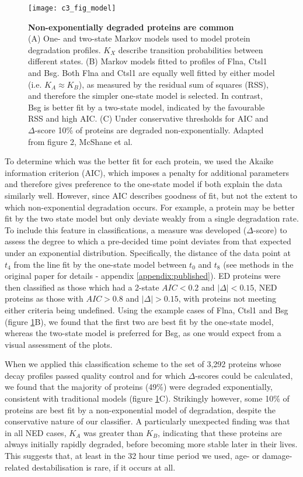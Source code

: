 \documentclass[a4paper,11pt,twoside,openright]{scrbook}
\begin{document}
\begin{figure}[h]
    \texttt{[image: c3\_fig\_model]}
    \caption[Non-exponentially degraded proteins are common]{\sffamily \textbf{Non-exponentially degraded proteins are common} \\ \small (A) One- and two-state Markov models used to model protein degradation profiles. $K_{X}$ describe transition probabilities between different states. (B) Markov models fitted to profiles of Flna, Ctsl1 and Bsg. Both Flna and Ctsl1 are equally well fitted by either model (i.e. $K_{A} \approx K_{B}$), as measured by the residual sum of squares (RSS), and therefore the simpler one-state model is selected. In contrast, Bsg is better fit by a two-state model, indicated by the favourable RSS and high AIC. (C) Under conservative thresholds for AIC and $\Delta$-score 10\% of proteins are degraded non-exponentially. Adapted from figure 2, McShane et al.\cite{McShane2016}}
    \label{figure:model}
\end{figure}

To determine which was the better fit for each protein, we used the Akaike information criterion \cite{Akaike1974} (AIC), which imposes a penalty for additional parameters and therefore gives preference to the one-state model if both explain the data similarly well. However, since AIC describes goodness of fit, but not the extent to which non-exponential degradation occurs. For example, a protein may be better fit by the two state model but only deviate weakly from a single degradation rate. To include this feature in classifications, a measure was developed ($\Delta$-score) to assess the degree to which a pre-decided time point deviates from that expected under an exponential distribution. Specifically, the distance of the data point at $t_{4}$ from the line fit by the one-state model between $t_{0}$ and $t_{8}$ (see methods in the original paper for details - appendix \ref{appendix:published}). ED proteins were then classified as those which had a 2-state $AIC < 0.2$ and $\lvert \Delta \rvert < 0.15$, NED proteins as those with $AIC > 0.8$ and $\lvert \Delta \rvert > 0.15$, with proteins not meeting either criteria being undefined. Using the example cases of Flna, Ctsl1 and Bsg (figure \ref{figure:model}B), we found that the first two are best fit by the one-state model, whereas the two-state model is preferred for Bsg, as one would expect from a visual assessment of the plots.

When we applied this classification scheme to the set of 3,292 proteins whose decay profiles passed quality control and for which $\Delta$-scores could be calculated, we found that the majority of proteins (49\%) were degraded exponentially, consistent with traditional models (figure \ref{figure:model}C). Strikingly however, some 10\% of proteins are best fit by a non-exponential model of degradation, despite the conservative nature of our classifier. A particularly unexpected finding was that in all NED cases, $K_{A}$ was greater than $K_{B}$, indicating that these proteins are always initially rapidly degraded, before becoming more stable later in their lives. This suggests that, at least in the 32 hour time period we used, age- or damage-related destabilisation is rare, if it occurs at all.
\end{document}
